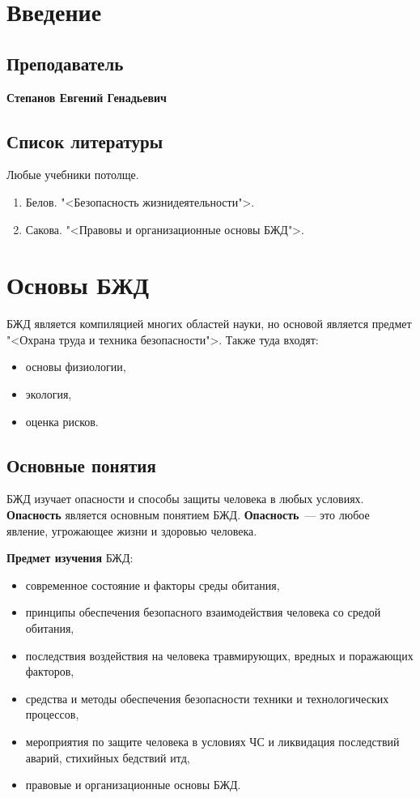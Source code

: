 \section{Введение}
\subsection{Преподаватель}
\textbf{Степанов Евгений Генадьевич}

\subsection{Список литературы}
Любые учебники потолще.
\begin{enumerate}
	\item Белов. "<Безопасность жизнидеятельности">.
	\item Сакова. "<Правовы и организационные основы БЖД">.
\end{enumerate}

\section{Основы БЖД}
БЖД является компиляцией многих областей науки, но основой является предмет "<Охрана труда и техника безопасности">. Также туда входят:
\begin{itemize}
	\item основы физиологии,
	\item экология,
	\item оценка рисков.
\end{itemize}

\subsection{Основные понятия}
БЖД изучает опасности и способы защиты человека в любых условиях. \textbf{Опасность} является основным понятием БЖД. \textbf{Опасность}~--- это любое явление, угрожающее жизни и здоровью человека.

\textbf{Предмет изучения} БЖД:
\begin{itemize}
	\item современное состояние и факторы среды обитания,
	\item принципы обеспечения безопасного взаимодействия человека со средой обитания,
	\item последствия воздействия на человека травмирующих, вредных и поражающих факторов,
	\item средства и методы обеспечения безопасности техники и технологических процессов,
	\item мероприятия по защите человека в условиях ЧС и ликвидация последствий аварий, стихийных бедствий итд,
	\item правовые и организационные основы БЖД.
\end{itemize}

